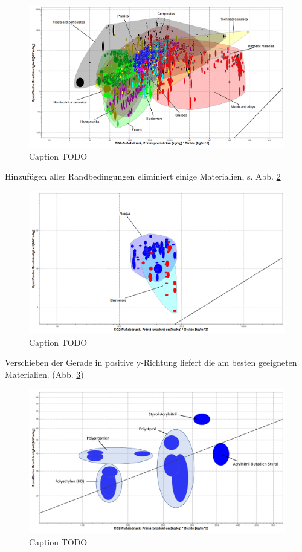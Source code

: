 \begin{figure}[H]
	\centering
	\includegraphics[width=1.0\linewidth]{chapter/Bilder/3_2_1}
	\caption{Caption TODO}
	\label{fig:ces_3_2_1}
\end{figure}
Hinzufügen aller Randbedingungen eliminiert einige Materialien, s. Abb. \ref{fig:ces_3_2_2}\\
\begin{figure}[H]
	\centering
	\includegraphics[width=1.0\linewidth]{chapter/Bilder/3_2_2}
	\caption{Caption TODO}
	\label{fig:ces_3_2_2}
\end{figure}
Verschieben der Gerade in positive y-Richtung liefert die am besten geeigneten Materialien. (Abb. \ref{fig:ces_3_2_3})\\
\begin{figure}[H]
	\centering
	\includegraphics[width=1.0\linewidth]{chapter/Bilder/3_2_3}
	\caption{Caption TODO}
	\label{fig:ces_3_2_3}
\end{figure}
